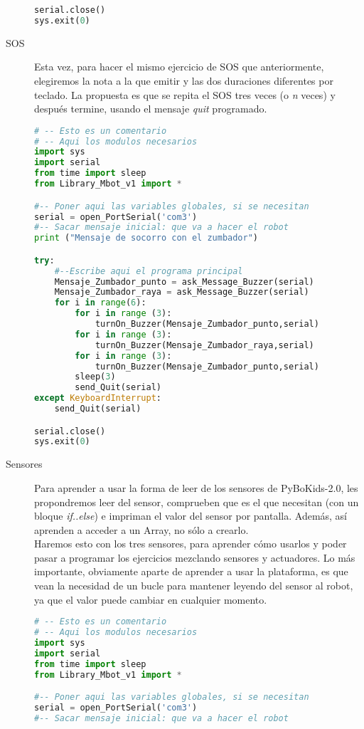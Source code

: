 \begin{description}
\begin{lstlisting}[language=python,caption={Solución para el ejercicio de carreras en Python}]
serial.close()
sys.exit(0)
\end{lstlisting}
	\item [SOS] Esta vez, para hacer el mismo ejercicio de SOS que anteriormente, elegiremos la nota a la que emitir y las dos duraciones diferentes por teclado. La propuesta es que se repita el SOS tres veces (o \textit{n} veces) y después termine, usando el mensaje \textit{quit} programado.
\begin{lstlisting}[language=python,caption={Solución en Python para el ejercicio S.O.S.}]
# -- Esto es un comentario		
# -- Aqui los modulos necesarios
import sys
import serial
from time import sleep
from Library_Mbot_v1 import *

#-- Poner aqui las variables globales, si se necesitan
serial = open_PortSerial('com3')
#-- Sacar mensaje inicial: que va a hacer el robot
print ("Mensaje de socorro con el zumbador")

try:
	#--Escribe aqui el programa principal
	Mensaje_Zumbador_punto = ask_Message_Buzzer(serial)
	Mensaje_Zumbador_raya = ask_Message_Buzzer(serial)
	for i in range(6):
		for i in range (3):
			turnOn_Buzzer(Mensaje_Zumbador_punto,serial)
		for i in range (3):
			turnOn_Buzzer(Mensaje_Zumbador_raya,serial)
		for i in range (3):
			turnOn_Buzzer(Mensaje_Zumbador_punto,serial)
		sleep(3)
		send_Quit(serial)
except KeyboardInterrupt:
	send_Quit(serial)

serial.close()
sys.exit(0)
\end{lstlisting}
	\item [Sensores] Para aprender a usar la forma de leer de los sensores de PyBoKids-2.0, les propondremos leer del sensor, comprueben que es el que necesitan (con un bloque \textit{if..else}) e impriman el valor del sensor por pantalla. Además, así aprenden a acceder a un Array, no sólo a crearlo. \\
	Haremos esto con los tres sensores, para aprender cómo usarlos y poder pasar a programar los ejercicios mezclando sensores y actuadores. Lo más importante, obviamente aparte de aprender a usar la plataforma, es que vean la necesidad de un bucle para mantener leyendo del sensor al robot, ya que el valor puede cambiar en cualquier momento.
\begin{lstlisting}[language=python,caption={Solución para distinguir los sensores en Python}]
# -- Esto es un comentario		
# -- Aqui los modulos necesarios
import sys
import serial
from time import sleep
from Library_Mbot_v1 import *

#-- Poner aqui las variables globales, si se necesitan
serial = open_PortSerial('com3')
#-- Sacar mensaje inicial: que va a hacer el robot


\end{lstlisting}
\end{description}
